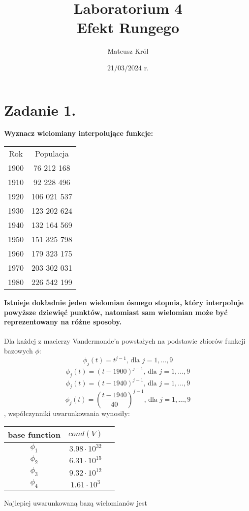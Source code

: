 \documentclass{article}
\title{%
Laboratorium 4\\
  \huge Efekt Rungego}
\author{Mateusz Król}
\date{21/03/2024 r.}
\begin{document}
\maketitle


\section*{Zadanie 1.}
\textbf{Wyznacz wielomiany interpolujące funkcje:}
\begin{center}
  \begin{tabular}{c c} 
   Rok & Populacja\\
   1900 & 76 212 168\\
   1910 & 92 228 496\\
   1920 & 106 021 537\\
   1930 & 123 202 624\\
   1940 & 132 164 569\\
   1950 & 151 325 798\\
   1960 & 179 323 175\\
   1970 & 203 302 031\\
   1980 &226 542 199
  \end{tabular}
\end{center}
\textbf{Istnieje dokładnie jeden wielomian ósmego stopnia, który interpoluje
 powyższe dziewięć punktów, natomiast sam wielomian może być reprezentowany na różne sposoby.}
\\\\
Dla każdej z macierzy Vandermonde'a powstałych na podstawie zbiorów funkcji 
bazowych $\phi$:
$$ \phi_j(t) = t^{j-1}\mbox{, dla } j = 1,\dots,9$$
$$ \phi_j(t) = (t-1900)^{j-1}\mbox{, dla } j = 1,\dots,9$$
$$ \phi_j(t) = (t-1940)^{j-1}\mbox{, dla } j = 1,\dots,9$$
$$ \phi_j(t) = \left(\frac{t-1940}{40}\right)^{j-1} \mbox{, dla } j = 1,\dots,9$$
, współczynniki uwarunkowania wynosiły:
\begin{center}
  \begin{tabular}{  |c|c|c| } 
   \hline
   base function & $cond(V)$\\
   \hline
   $\phi_1$ & $3.98 \cdot 10^{32}$ \\
   \hline
   $\phi_2$ & $6.31 \cdot 10^{15}$ \\
   \hline
   $\phi_3$ & $9.32 \cdot 10^{12}$ \\
   \hline
   $\phi_4$ & $1.61 \cdot 10^{3}$ \\
   \hline
  \end{tabular}
\end{center}
Najlepiej uwarunkowaną bazą wielomianów jest
\end{document}
